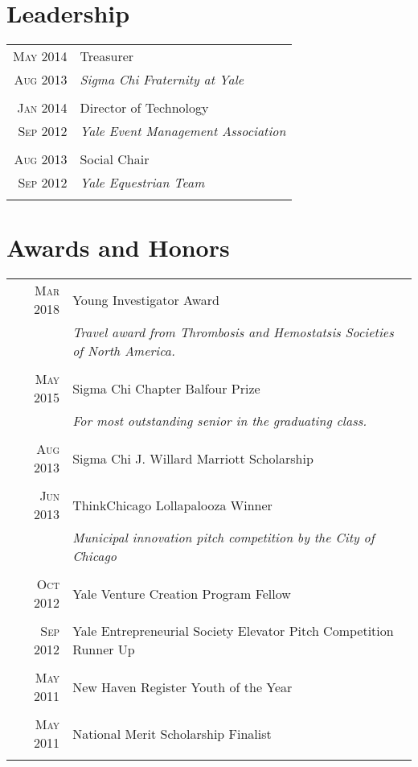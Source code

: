 \documentclass[a4paper,10pt]{article}
\begin{document}
\section{Leadership}
\begin{longtable}{r|p{11cm}}
 \nopagebreak \textsc{May 2014} & Treasurer \\
 \nopagebreak \textsc{Aug 2013} & \small\emph{Sigma Chi Fraternity at Yale} \\
 \multicolumn{2}{c}{} \\
 \nopagebreak \textsc{Jan 2014} & Director of Technology \\
 \nopagebreak \textsc{Sep 2012} & \small\emph{Yale Event Management Association} \\
 \multicolumn{2}{c}{} \\
 \nopagebreak \textsc{Aug 2013} & Social Chair \\
 \nopagebreak \textsc{Sep 2012} & \small\emph{Yale Equestrian Team} \\
 \multicolumn{2}{c}{} \\
\end{longtable}

\section{Awards and Honors}
\begin{tabular}{rp{11cm}}
 \textsc{Mar} 2018 & Young Investigator Award \\
 							    & \small\emph{Travel award from Thrombosis and Hemostatsis Societies of North America.} \\
 \multicolumn{2}{c}{} \\
 \textsc{May} 2015 & Sigma Chi Chapter Balfour Prize \\
 							    & \small\emph{For most outstanding senior in the graduating class.} \\
 \multicolumn{2}{c}{} \\
 \textsc{Aug} 2013 & Sigma Chi J. Willard Marriott Scholarship \\
 \multicolumn{2}{c}{} \\
 \textsc{Jun} 2013 & ThinkChicago Lollapalooza Winner \\
 							    & \small\emph{Municipal innovation pitch competition by the City of Chicago} \\
 \multicolumn{2}{c}{} \\
 \textsc{Oct} 2012 & Yale Venture Creation Program Fellow \\
 \multicolumn{2}{c}{} \\	
 \textsc{Sep} 2012 & Yale Entrepreneurial Society Elevator Pitch Competition Runner Up \\
 \multicolumn{2}{c}{} \\
 \textsc{May} 2011 & New Haven Register Youth of the Year \\
 \multicolumn{2}{c}{} \\
 \textsc{May} 2011 & National Merit Scholarship Finalist \\
 \multicolumn{2}{c}{} \\
\end{tabular}
\end{document}
